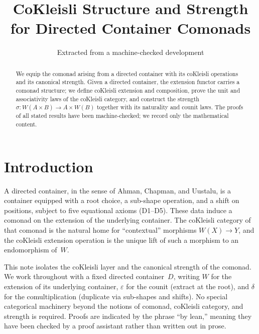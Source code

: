 \documentclass[11pt,a4paper]{article}
\title{CoKleisli Structure and Strength\\
  for Directed Container Comonads}
\author{Extracted from a machine-checked development}
\date{}
\theoremstyle{plain}
\theoremstyle{definition}
\begin{document}
\maketitle

\begin{abstract}
We equip the comonad arising from a directed container with its coKleisli
operations and its canonical strength. Given a directed container, the
extension functor carries a comonad structure; we define coKleisli extension
and composition, prove the unit and associativity laws of the coKleisli
category, and construct the strength
$\sigma : W(A \times B) \to A \times W(B)$ together with its naturality and
counit laws. The proofs of all stated results have been machine-checked; we
record only the mathematical content.
\end{abstract}

\tableofcontents
\bigskip

\section{Introduction}

A directed container, in the sense of Ahman, Chapman, and Uustalu, is a
container equipped with a root choice, a sub-shape operation, and a shift on
positions, subject to five equational axioms (D1--D5). These data induce a
comonad on the extension of the underlying container. The coKleisli category
of that comonad is the natural home for ``contextual'' morphisms
$W(X) \to Y$, and the coKleisli extension operation is the unique lift of such
a morphism to an endomorphism of~$W$.

This note isolates the coKleisli layer and the canonical strength of the
comonad. We work throughout with a fixed directed container~$D$, writing $W$
for the extension of its underlying container, $\varepsilon$ for the counit
(extract at the root), and $\delta$ for the comultiplication (duplicate via
sub-shapes and shifts). No special categorical machinery beyond the notions of
comonad, coKleisli category, and strength is required. Proofs are indicated by
the phrase ``by lean,'' meaning they have been checked by a proof assistant
rather than written out in prose.
\end{document}
